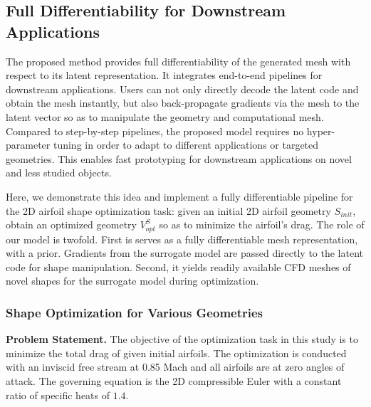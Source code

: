 \subsection{Full Differentiability for Downstream Applications}
\label{ch3:sec:shape_optimization}

The proposed method provides full differentiability of the generated mesh with respect to its latent representation.
It integrates end-to-end pipelines for downstream applications.
Users can not only directly decode the latent code and obtain the mesh instantly, but also back-propagate gradients via the mesh to the latent vector so as to manipulate the geometry and computational mesh.
Compared to step-by-step pipelines, the proposed model requires no hyper-parameter tuning in order to adapt to different applications or targeted geometries.
This enables fast prototyping for downstream applications on novel and less studied objects.

Here, we demonstrate this idea and implement a fully differentiable pipeline for the 2D airfoil shape optimization task: given an initial 2D airfoil geometry $S_{init}$, obtain an optimized geometry $V^S_{opt}$ so as to minimize the airfoil's drag. The role of our model is twofold. First is serves as a fully differentiable mesh representation, with a prior. Gradients from the surrogate model are passed directly to the latent code for shape manipulation. Second,  it yields readily available CFD meshes of novel shapes for the surrogate model during optimization.

\subsubsection{Shape Optimization for Various Geometries}

\noindent \textbf{Problem Statement.}
The objective of the optimization task in this study is to minimize the total drag of given initial airfoils.
The optimization is conducted with an inviscid free stream at 0.85 Mach and all airfoils are at zero angles of attack.
The governing equation is the 2D compressible Euler with a constant ratio of specific heats of $1.4$.

